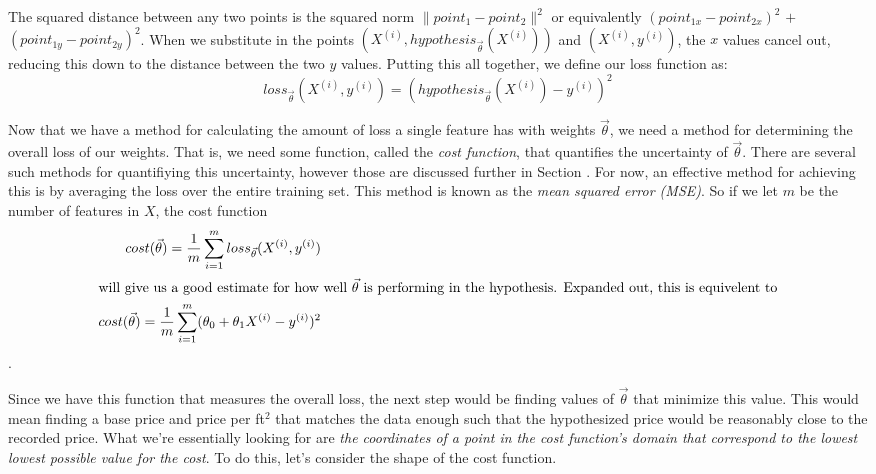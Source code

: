 The squared distance between any two points is the squared norm $\| point_1 -
point_2 \|^2$ or equivalently $(point_{1x}-point_{2x})^2$ $+$
$(point_{1y}-point_{2y})^2$. When we substitute in the points $(X^{(i)},
hypothesis_{\vec\theta}(X^{(i)}))$ and $(X^{(i)}, y^{(i)})$, the $x$ values cancel
out, reducing this down to the distance between the two $y$ values. Putting this
all together, we define our loss function as:
\begin{equation}
    loss_{\vec\theta}(X^{(i)}, y^{(i)}) = (hypothesis_{\vec\theta}(X^{(i)}) - y^{(i)})^2
\end{equation}

Now that we have a method for calculating the amount of loss a single feature
has with weights $\vec\theta$, we need a method for determining the overall loss of
our weights. That is, we need some function, called the \emph{cost function},
that quantifies the uncertainty of $\vec\theta$. There are several such methods for
quantifiying this uncertainty, however those are discussed further in Section
\placeholder. For now, an effective method for achieving this is by averaging
the loss over the entire training set. This method is known as the \emph{mean
squared error (MSE)}. So if we let $m$ be the number of features in $X$, the
cost function
\begin{subequations}
    \begin{align}
        cost(\vec\theta) = \frac{1}{m}\sum_{i=1}^m loss_{\vec\theta}(X^{(i)}, y^{(i)}) \\
    \intertext{will give us a good estimate for how well $\vec\theta$ is performing
        in the hypothesis. Expanded out, this is equivelent to}
        cost(\vec\theta) = \frac{1}{m}\sum_{i=1}^m (\theta_0 + \theta_1X^{(i)} -
        y^{(i)})^2
    \end{align}
\end{subequations}
.

Since we have this function that measures the overall loss, the next step would
be finding values of $\vec\theta$ that minimize this value. This would mean finding
a base price and price per ft$^2$ that matches the data enough such that the
hypothesized price would be reasonably close to the recorded price. What we're
essentially looking for are \emph{the coordinates of a point in the cost
function's domain that correspond to the lowest lowest possible value for the
cost}. To do this, let's consider the shape of the cost function.

